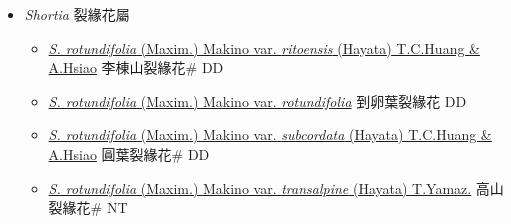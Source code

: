 
  \begin{itemize}
 \item[] \textit{Shortia} 裂緣花屬
                    
  \begin{itemize}
        \item[] \href{http://www.theplantlist.org/tpl1.1/search?q=Shortia+rotundifolia+var.+ritoensis}{\textit{S. rotundifolia} (Maxim.) Makino var. \textit{ritoensis} (Hayata) T.C.Huang \& A.Hsiao}   李棟山裂緣花\# DD
        \item[] \href{http://www.theplantlist.org/tpl1.1/search?q=Shortia+rotundifolia+var.+rotundifolia}{\textit{S. rotundifolia} (Maxim.) Makino var. \textit{rotundifolia}}   到卵葉裂緣花 DD
        \item[] \href{http://www.theplantlist.org/tpl1.1/search?q=Shortia+rotundifolia+var.+subcordata}{\textit{S. rotundifolia} (Maxim.) Makino var. \textit{subcordata} (Hayata) T.C.Huang \& A.Hsiao}   圓葉裂緣花\# DD
        \item[] \href{http://www.theplantlist.org/tpl1.1/search?q=Shortia+rotundifolia+var.+transalpine}{\textit{S. rotundifolia} (Maxim.) Makino var. \textit{transalpine} (Hayata) T.Yamaz.}   高山裂緣花\# NT
  \end{itemize}
  \end{itemize}
